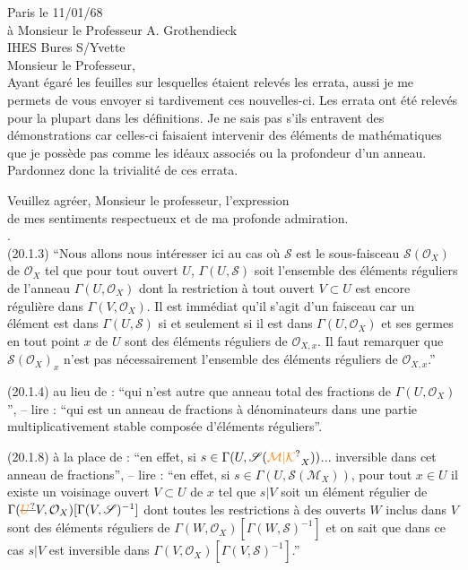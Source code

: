Paris le 11/01/68\\

à Monsieur le Professeur A. Grothendieck\\
IHES \qquad Bures S/Yvette\\

Monsieur le Professeur,\\

Ayant égaré les feuilles sur lesquelles étaient relevés les errata, aussi je me permets de vous envoyer si tardivement ces nouvelles-ci. Les errata ont été relevés pour la plupart dans les définitions. Je ne sais pas s'ils entravent des démonstrations car celles-ci faisaient intervenir des éléments de mathématiques que je  possède pas comme les idéaux associés ou la profondeur d'un anneau. Pardonnez donc la trivialité de ces errata.

Veuillez agréer, Monsieur le professeur, l'expression\\
de mes sentiments respectueux et de ma profonde admiration.\\

.\\


(20.1.3)  ``Nous allons nous intéresser ici au cas où $\mathscr S$ est le sous-faisceau $\mathscr S(\mathcal O_X)$ de $\mathcal O_X$ tel que pour tout ouvert $U$, $\Gamma(U,\mathscr S)$ soit l'ensemble des éléments réguliers de l'anneau $\Gamma(U,\mathcal O_X)$ dont la restriction à tout ouvert $V\subset U$ est encore régulière dans $\Gamma(V,\mathcal O_X)$. Il est immédiat qu'il s'agit d'un faisceau car un élément est dans $\Gamma(U,\mathscr S)$ si et seulement si il est dans $\Gamma(U,\mathcal O_X)$ et  ses germes en tout point $x$ de $U$ sont des éléments réguliers de $\mathcal O_{X,x}$. Il faut remarquer que $\mathscr S(\mathcal O_X)_x$ n'est pas  nécessairement l'ensemble des éléments réguliers de $\mathcal O_{X,x}$.''

(20.1.4) au lieu de : ``qui n'est autre que anneau total des fractions de $\Gamma(U,\mathcal O_X)$'', -- lire : ``qui est un anneau de fractions à dénominateurs dans une partie multiplicativement stable composée d'éléments réguliers''.

(20.1.8) à la place de : ``en effet, si $s\in\Gamma(U,\mathscr S(\unsure{\mathcal M|\mathcal K}_X))$... inversible dans cet anneau de fractions'', -- lire : ``en effet, si $s\in\Gamma(U,\mathscr S(\mathcal M_X))$, pour tout $x\in U$ il existe un voisinage ouvert $V\subset U$ de $x$ tel que $s|V$ soit un élément régulier de $\Gamma(\deleted{\unsure{U}}V,\mathcal O_X)[\Gamma(V,\mathscr S)^{-1}]$ dont toutes les restrictions à des ouverts $W$ inclus dans $V$ sont des éléments réguliers de $\Gamma(W,\mathcal O_X)[\Gamma(W,\mathscr S)^{-1}]$ et on sait que dans ce cas $s|V$ est inversible dans $\Gamma(V,\mathcal O_X)[\Gamma(V,\mathscr S)^{-1}]$.''

